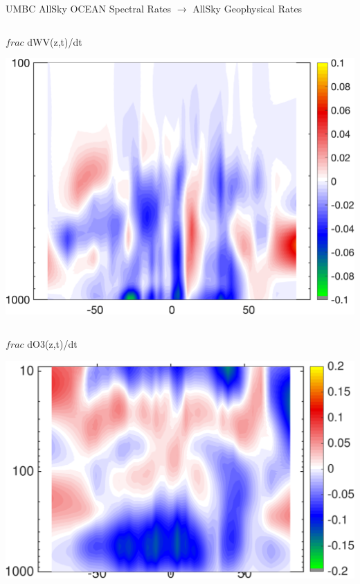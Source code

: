 \documentclass[10pt,t]{beamer}
\begin{document}
\begin{frame}{UMBC AllSky OCEAN Spectral Rates $\rightarrow$ AllSky Geophysical Rates}
\begin{columns}
\begin{column}{0.45\columnwidth}
\begin{block}{\footnotesize $frac$ dWV(z,t)/dt}
\vspace{-0.1in}
\begin{center}
\includegraphics[width=\linewidth]{Figs/CloudAnom/Desc_ocean/wv_lat_p_rates_from_obs_specral_rates.png}
\end{center}
\end{block}
\end{column}
\end{columns}

\vspace{-0.25in}

\begin{columns}
\begin{column}{0.45\columnwidth}
\begin{block}{\footnotesize $frac$ dO3(z,t)/dt}
\vspace{-0.1in}
\begin{center}
\includegraphics[width=\linewidth]{Figs/CloudAnom/Desc_ocean/o3_lat_p_rates_from_obs_specral_rates.png}
\end{center}
\end{block}
\end{column}


\end{columns}
\end{frame}
\end{document}
